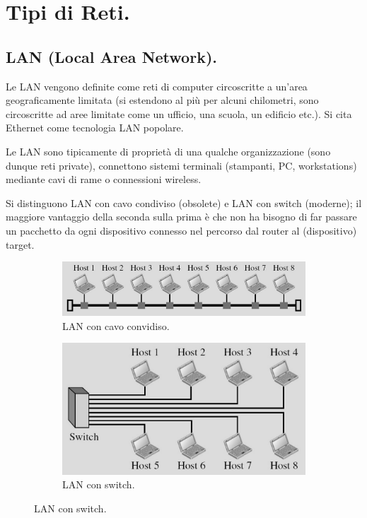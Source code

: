 \documentclass[11pt, italian, openany]{book}
\begin{document}
\begin{sloppypar}
\section{Tipi di Reti.}
\subsection*{LAN (Local Area Network).}
Le LAN vengono definite come reti di computer circoscritte a un'area geograficamente limitata (si estendono al pi\`u per alcuni chilometri,
sono circoscritte ad aree limitate come un ufficio, una scuola, un edificio etc.). Si cita Ethernet come tecnologia LAN popolare.

Le LAN sono tipicamente di propriet\`a di una qualche organizzazione (sono dunque reti private), connettono sistemi terminali (stampanti, PC,
workstations) mediante cavi di rame o connessioni wireless.

Si distinguono LAN con cavo condiviso (obsolete) e LAN con switch (moderne); il maggiore vantaggio della seconda sulla prima \`e che non ha
bisogno di far passare un pacchetto da ogni dispositivo connesso nel percorso dal router al (dispositivo) target.

\begin{figure}[h!]
	\begin{subfigure}{0.49 \linewidth} \centering
		\includegraphics[scale=0.35]{images/lan-obsoleta.png}
		\caption{LAN con cavo convidiso.}
	\end{subfigure}
	\begin{subfigure}{0.49 \linewidth} \centering
		\includegraphics[scale=0.35]{images/lan-moderna.png}
		\caption{LAN con switch.}
	\end{subfigure}
\end{figure}


\end{sloppypar}
\end{document}
